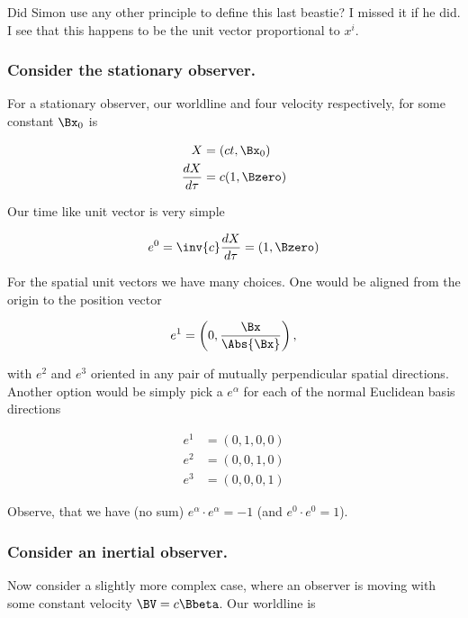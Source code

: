 Did Simon use any other principle to define this last beastie?  I missed it if he did.  I see that this happens to be the unit vector proportional to $x^i$.

\subsubsection{Consider the stationary observer.}

For a stationary observer, our worldline and four velocity respectively, for some constant $\Bx_0$ is

\begin{align}\label{eqn:relativisticElectrodynamicsT2:600}
X &= ( ct, \Bx_0 ) \\
\frac{dX}{d\tau} &= c ( 1, \Bzero) 
\end{align}

Our time like unit vector is very simple

\begin{equation}\label{eqn:relativisticElectrodynamicsT2:610}
e^0 = \inv{c} \frac{dX}{d\tau} = ( 1, \Bzero ) 
\end{equation}

For the spatial unit vectors we have many choices.  One would be aligned from the origin to the position vector

\begin{equation}\label{eqn:relativisticElectrodynamicsT2:620}
e^1 = \left( 0, \frac{\Bx}{\Abs{\Bx}} \right),
\end{equation}

with $e^2$ and $e^3$ oriented in any pair of mutually perpendicular spatial directions.  Another option would be simply pick a $e^\alpha$ for each of the normal Euclidean basis directions

\begin{align}\label{eqn:relativisticElectrodynamicsT2:630}
e^1 &= ( 0, 1, 0, 0 ) \\
e^2 &= ( 0, 0, 1, 0 ) \\
e^3 &= ( 0, 0, 0, 1 )
\end{align}

Observe, that we have (no sum) $e^\alpha \cdot e^\alpha = -1$ (and $e^0 \cdot e^0 = 1$).

\subsubsection{Consider an inertial observer.}

Now consider a slightly more complex case, where an observer is moving with some constant velocity $\BV = c \Bbeta$.  Our worldline is

